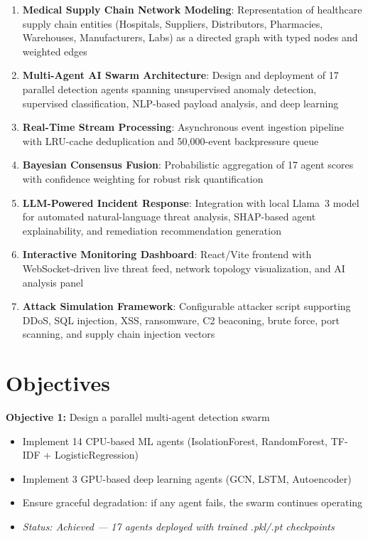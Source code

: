\documentclass[12pt, a4paper]{report}
\begin{document}
\begin{enumerate}
    \item \textbf{Medical Supply Chain Network Modeling}: Representation of healthcare supply chain entities (Hospitals, Suppliers, Distributors, Pharmacies, Warehouses, Manufacturers, Labs) as a directed graph with typed nodes and weighted edges
    \item \textbf{Multi-Agent AI Swarm Architecture}: Design and deployment of 17 parallel detection agents spanning unsupervised anomaly detection, supervised classification, NLP-based payload analysis, and deep learning
    \item \textbf{Real-Time Stream Processing}: Asynchronous event ingestion pipeline with LRU-cache deduplication and 50,000-event backpressure queue
    \item \textbf{Bayesian Consensus Fusion}: Probabilistic aggregation of 17 agent scores with confidence weighting for robust risk quantification
    \item \textbf{LLM-Powered Incident Response}: Integration with local Llama~3 model for automated natural-language threat analysis, SHAP-based agent explainability, and remediation recommendation generation
    \item \textbf{Interactive Monitoring Dashboard}: React/Vite frontend with WebSocket-driven live threat feed, network topology visualization, and AI analysis panel
    \item \textbf{Attack Simulation Framework}: Configurable attacker script supporting DDoS, SQL injection, XSS, ransomware, C2 beaconing, brute force, port scanning, and supply chain injection vectors
\end{enumerate}

\section{Objectives}

\noindent\textbf{Objective 1:} Design a parallel multi-agent detection swarm
\begin{itemize}
    \item Implement 14 CPU-based ML agents (IsolationForest, RandomForest, TF-IDF + LogisticRegression)
    \item Implement 3 GPU-based deep learning agents (GCN, LSTM, Autoencoder)
    \item Ensure graceful degradation: if any agent fails, the swarm continues operating
    \item \textit{Status: Achieved — 17 agents deployed with trained .pkl/.pt checkpoints}
\end{itemize}
\end{document}
